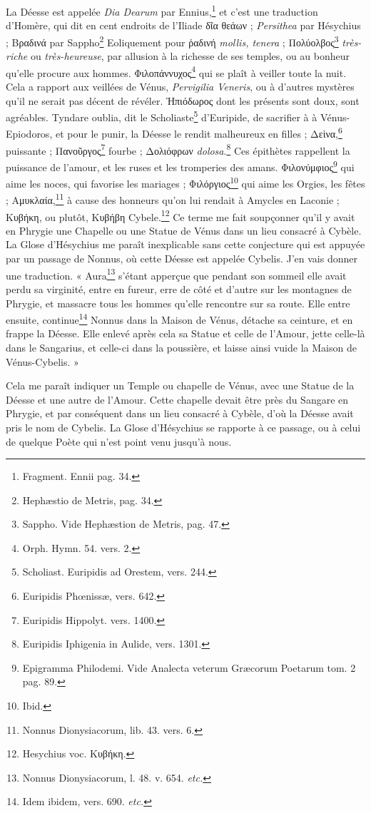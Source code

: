 \documentclass[a4paper, 11pt, oneside, polutonikogreek, french]{article}
\begin{document}
La Déesse est appelée \emph{Dia Dearum} par Ennius,\footnote{Fragment. Ennii pag. 34.} et c'est une traduction d'Homère, qui dit en cent endroits de l'Iliade δῖα θεάων ; \emph{Persithea} par Hésychius ; Βραδινά par Sappho\footnote{Hephæstio de Metris, pag. 34.} Eoliquement pour ῥαδινή \emph{mollis, tenera} ; Πολύολβος\footnote{Sappho. Vide Hephæstion de Metris, pag. 47.} \emph{très-riche} ou \emph{très-heureuse}, par allusion à la richesse de ses temples, ou au bonheur qu'elle procure aux hommes. Φιλοπάννυχος\footnote{Orph. Hymn. 54. vers. 2.} qui se plaît à veiller toute la nuit. Cela a rapport aux veillées de Vénus, \emph{Pervigilia Veneris}, ou à d'autres mystères qu'il ne serait pas décent de révéler. Ἠπιόδωρος dont les présents sont doux, sont agréables. Tyndare oublia, dit le Scholiaste\footnote{Scholiast. Euripidis ad Orestem, vers. 244.} d'Euripide, de sacrifier à à Vénus-Epiodoros, et pour le punir, la Déesse le rendit malheureux en filles ; Δεὶνα,\footnote{Euripidis Phœnissæ, vers. 642.} puissante ; Πανοῦργος\footnote{Euripidis Hippolyt. vers. 1400.} fourbe ; Δολιόφρων \emph{dolosa}.\footnote{Euripidis Iphigenia in Aulide, vers. 1301.} Ces épithètes rappellent la puissance de l'amour, et les ruses et les tromperies des amans. Φιλονύμφιος\footnote{Epigramma Philodemi. Vide Analecta veterum Græcorum Poetarum tom. 2 pag. 89.} qui aime les noces, qui favorise les mariages ; Φιλόργιος\footnote{Ibid.} qui aime les Orgies, les fêtes ; Αμυκλαία,\footnote{Nonnus Dionysiacorum, lib. 43. vers. 6.} à cause des honneurs qu'on lui rendait à Amycles en Laconie ; Κυβήκη, ou plutôt, Κυβήβη Cybele.\footnote{Hesychius voc. Κυβήκη.} Ce terme me fait soupçonner qu'il y avait en Phrygie une Chapelle ou une Statue de Vénus dans un lieu consacré à Cybèle. La Glose d'Hésychius me paraît inexplicable sans cette conjecture qui est appuyée par un passage de Nonnus, où cette Déesse est appelée Cybelis. J'en vais donner une traduction. « Aura\footnote{Nonnus Dionysiacorum, l. 48. v. 654. \emph{etc.}} s'étant apperçue que pendant son sommeil elle avait perdu sa virginité, entre en fureur, erre de côté et d'autre sur les montagnes de Phrygie, et massacre tous les hommes qu'elle rencontre sur sa route. Elle entre ensuite, continue\footnote{Idem ibidem, vers. 690. \emph{etc.}} Nonnus dans la Maison de Vénus, détache sa ceinture, et en frappe la Déesse. Elle enlevé après cela sa Statue et celle de l'Amour, jette celle-là dans le Sangarius, et celle-ci dans la poussière, et laisse ainsi vuide la Maison de Vénus-Cybelis. »

Cela me paraît indiquer un Temple ou chapelle de Vénus, avec une Statue de la Déesse et une autre de l'Amour. Cette chapelle devait être près du Sangare en Phrygie, et par conséquent dans un lieu consacré à Cybèle, d'où la Déesse avait pris le nom de Cybelis. La Glose d'Hésychius se rapporte à ce passage, ou à celui de quelque Poète qui n'est point venu jusqu'à nous.
\end{document}
